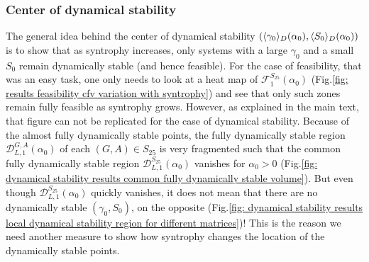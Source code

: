 \documentclass[12pt, titlepage, twoside, openright]{report}
\begin{document}
\subsubsection{Center of dynamical stability}\label{app : center of gravity local dynamical stability}
The general idea behind the center of dynamical stability $(\langle \gamma_0 \rangle_D(\alpha_0), \langle S_0 \rangle_D(\alpha_0))$ is to show that as syntrophy increases, only systems with a large $\gamma_0$ and a small $S_0$ remain dynamically stable (and hence feasible). For the case of feasibility, that was an easy task, one only needs to look at a heat map of $\mathcal{F}^{S_{25}}_1(\alpha_0)$ (Fig.\ref{fig: results feasibility cfv variation with syntrophy}) and see that only such zones remain fully feasible as syntrophy grows. However, as explained in the main text, that figure can not be replicated for the case of dynamical stability. Because of the almost fully dynamically stable points, the fully dynamically stable region $\mathcal{D}_{L,1}^{G,A}(\alpha_0)$ of each $(G,A) \in S_{25}$ is very fragmented such that the common fully dynamically stable region $\mathcal{D}_{L,1}^{S_{25}}(\alpha_0)$ vanishes for $\alpha_0 > 0$ (Fig.\ref{fig: dynamical stability results common fully dynamically stable volume}). But even though $\mathcal{D}_{L,1}^{S_{25}}(\alpha_0)$ quickly vanishes, it does not mean that there are no dynamically stable $(\gamma_0, S_0)$, on the opposite (Fig.\ref{fig: dynamical stability results local dynamical stability region for different matrices})! This is the reason we need another measure to show how syntrophy changes the location of the dynamically stable points.
\end{document}
